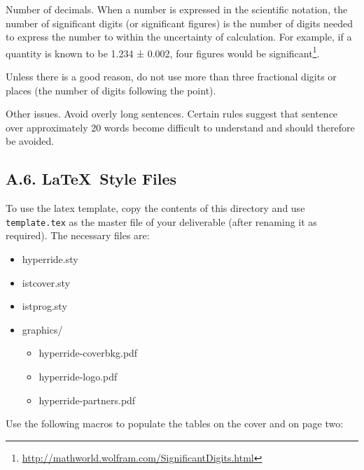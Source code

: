 Number of decimals. When a number is expressed in the scientific notation, the number of significant digits (or significant figures) is the number of digits needed to express the number to within the uncertainty of calculation. For example, if a quantity is known to be 1.234 ± 0.002, four figures would be significant\footnote{\url{http://mathworld.wolfram.com/SignificantDigits.html}}.

Unless there is a good reason, do not use more than three fractional digits or places (the number of digits following the point).

Other issues. Avoid overly long sentences. Certain rules suggest that sentence over approximately 20 words become difficult to understand and should therefore be avoided. 

\subsection*{A.6. \LaTeX\ Style Files}
\label{sec:appendix-a6-latex-style-files}

\newcommand{\macro}[1]{{\tt \textbackslash #1}}

To use the latex template, copy the contents of this directory and use {\tt template.tex} as the master file of your deliverable (after renaming it as required). The necessary files are:

\begin{itemize}
	\item hyperride.sty
	\item istcover.sty
	\item istprog.sty
	\item graphics/
	\begin{itemize}
		\item hyperride-coverbkg.pdf
		\item hyperride-logo.pdf
		\item hyperride-partners.pdf
	\end{itemize}
\end{itemize}

Use the following macros to populate the tables on the cover and on page two:

